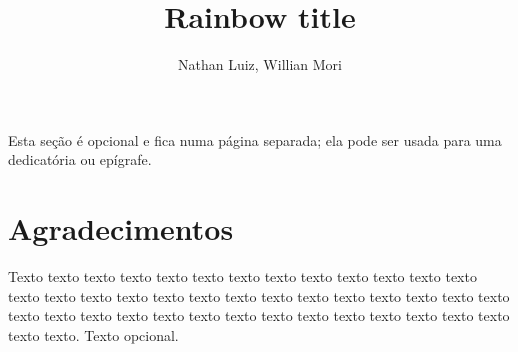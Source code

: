 \documentclass[a4paper,12pt,twoside,brazilian,english]{book}
\title{Rainbow title}[Rainbow subtitle]
\author[fem]{Nathan Luiz, Willian Mori}
\begin{document}

\frontmatter

\pagestyle{plain}

\onehalfspacing %

\maketitle %


\begin{dedicatoria}
Esta seção é opcional e fica numa página separada; ela pode ser usada para
uma dedicatória ou epígrafe.
\end{dedicatoria}


\chapter*{Agradecimentos}

Texto texto texto texto texto texto texto texto texto texto texto texto texto
texto texto texto texto texto texto texto texto texto texto texto texto texto
texto texto texto texto texto texto texto texto texto texto texto texto texto
texto texto texto texto. Texto opcional.


\end{document}
